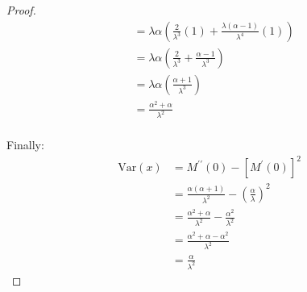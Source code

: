 \documentclass[12pt]{article}
\begin{document}
\begin{proof}
\begin{equation}
\begin{split}
								&=	\lambda\alpha\left(\frac{2}{\lambda^3}(1) + \frac{\lambda(\alpha-1)}{\lambda^4}(1)\right)\\
								&=	\lambda\alpha\left(\frac{2}{\lambda^3} + \frac{\alpha-1}{\lambda^3}\right)\\
								&=	\lambda\alpha\left(\frac{\alpha+1}{\lambda^3}\right)\\
								&=	\frac{\alpha^2 + \alpha}{\lambda^2}
		\end{split}
	\end{equation}\\[-30pt]
	Finally:\vspace*{-12pt}
	\begin{equation}
		\begin{split}
			\text{Var}(x)	&=	 M^{\prime\prime}(0) - [M^\prime(0)]^2\\
							&=	\frac{\alpha(\alpha+1)}{\lambda^2} - \left(\frac{\alpha}{\lambda}\right)^2\\
							&=	\frac{\alpha^2+\alpha}{\lambda^2} - \frac{\alpha^2}{\lambda^2}\\
							&=	\frac{\alpha^2 + \alpha -\alpha^2}{\lambda^2}\\
							&=	\frac{\alpha}{\lambda^2}
		\end{split}
	\end{equation}
\end{proof}
\end{document}
